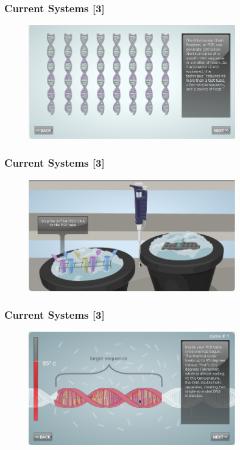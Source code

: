 \begin{frame}
\frametitle{Current Systems [3]}
\begin{figure}
  \begin{center}
    \includegraphics[width=0.8\textwidth]{./img/currentSystems3-2.png}
  \end{center}
\end{figure}
\end{frame}

\begin{frame}
\frametitle{Current Systems [3]}
\begin{figure}
  \begin{center}
    \includegraphics[width=0.8\textwidth]{./img/currentSystems3-4.png}
  \end{center}
\end{figure}
\end{frame}

\begin{frame}
\frametitle{Current Systems [3]}
\begin{figure}
  \begin{center}
    \includegraphics[width=0.8\textwidth]{./img/currentSystems3-5.png}
  \end{center}
\end{figure}
\end{frame}

